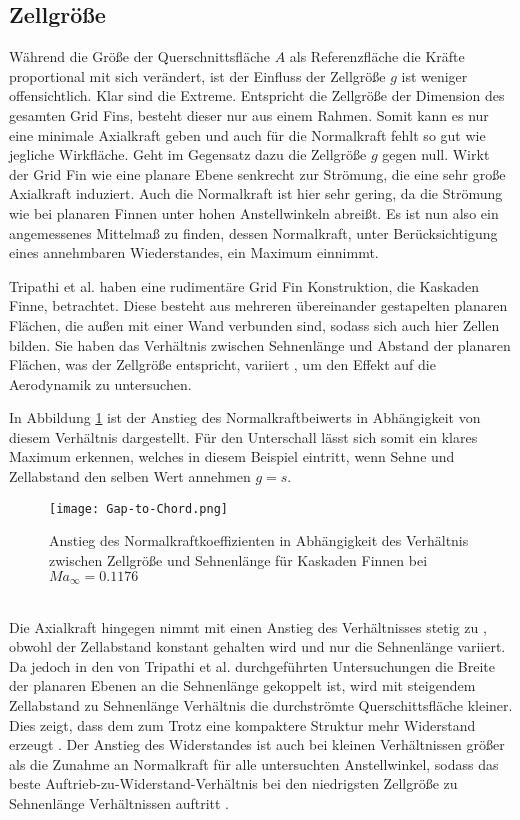 \subsection{Zellgröße}
Während die Größe der Querschnittsfläche $A$ als Referenzfläche die Kräfte proportional mit sich verändert, ist der Einfluss der Zellgröße $g$ ist weniger offensichtlich. Klar sind die Extreme. Entspricht die Zellgröße der Dimension des gesamten Grid Fins, besteht dieser nur aus einem Rahmen. Somit kann es nur eine minimale Axialkraft geben und auch für die Normalkraft fehlt so gut wie jegliche Wirkfläche. Geht im Gegensatz dazu die Zellgröße $g$ gegen null. Wirkt der Grid Fin wie eine planare Ebene senkrecht zur Strömung, die eine sehr große Axialkraft induziert. Auch die Normalkraft ist hier sehr gering, da die Strömung wie bei planaren Finnen unter hohen Anstellwinkeln abreißt. Es ist nun also ein angemessenes Mittelmaß zu finden, dessen Normalkraft, unter Berücksichtigung eines annehmbaren Wiederstandes, ein Maximum einnimmt.

Tripathi et al. haben eine rudimentäre Grid Fin Konstruktion, die Kaskaden Finne, betrachtet. Diese besteht aus mehreren übereinander gestapelten planaren Flächen, die außen mit einer Wand verbunden sind, sodass sich auch hier Zellen bilden. Sie haben das Verhältnis zwischen Sehnenlänge und Abstand der planaren Flächen, was der Zellgröße entspricht, variiert \cite{ChordVar}, um den Effekt auf die Aerodynamik zu untersuchen.

In Abbildung \ref{abb_Gap-Chord} ist der Anstieg des Normalkraftbeiwerts in Abhängigkeit von diesem Verhältnis dargestellt. Für den Unterschall lässt sich somit ein klares Maximum erkennen, welches in diesem Beispiel eintritt, wenn Sehne und Zellabstand den selben Wert annehmen $g=s$.
\begin{figure}[h]
	\centering
	\texttt{[image: Gap-to-Chord.png]}
	\begin{flushright}
	\end{flushright}
	\caption{Anstieg des Normalkraftkoeffizienten in Abhängigkeit des Verhältnis zwischen Zellgröße und Sehnenlänge für Kaskaden Finnen bei $Ma_\infty = 0.1176$}
	\label{abb_Gap-Chord}
\end{figure}\\
Die Axialkraft hingegen nimmt mit einen Anstieg des Verhältnisses stetig zu \cite{ChordVar}, obwohl der Zellabstand konstant gehalten wird und nur die Sehnenlänge variiert. Da jedoch in den von Tripathi et al. durchgeführten Untersuchungen die Breite der planaren Ebenen an die Sehnenlänge gekoppelt ist, wird mit steigendem Zellabstand zu Sehnenlänge Verhältnis die durchströmte Querschittsfläche kleiner. Dies zeigt, dass dem zum Trotz eine kompaktere Struktur mehr Widerstand erzeugt \cite{ChordVar}. Der Anstieg des Widerstandes ist auch bei kleinen Verhältnissen größer als die Zunahme an Normalkraft für alle untersuchten Anstellwinkel, sodass das beste Auftrieb-zu-Widerstand-Verhältnis bei den niedrigsten Zellgröße zu Sehnenlänge Verhältnissen auftritt \cite{ChordVar}.

